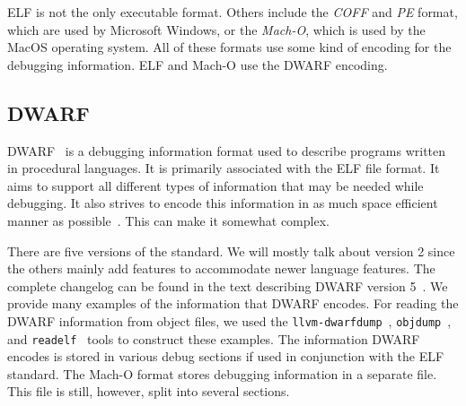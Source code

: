 ELF is not the only executable format. Others include the \textit{COFF} and
\textit{PE} format, which are used by Microsoft Windows, or the
\textit{Mach-O}, which is used by the MacOS operating system. All of these
formats use some kind of encoding for the debugging information. ELF and Mach-O
use the DWARF encoding.

\subsection{DWARF}
DWARF~\cite{dwarf} is a debugging information format used to describe programs
written in procedural languages. It is primarily associated with the ELF file
format. It aims to support all different types of information that may be
needed while debugging. It also strives to encode this information in as much
space efficient manner as possible~\cite{dwarf}. This can make it somewhat
complex. 

There are five versions of the standard. We will mostly talk about version 2
since the others mainly add features to accommodate newer language features.
The complete changelog can be found in the text describing DWARF version
5~\cite{dwarf-5}. We provide many examples of the information that DWARF
encodes. For reading the DWARF information from object files, we used the
\texttt{llvm-dwarfdump}~\cite{dwarfdump}, \texttt{objdump}~\cite{objdump}, and
\texttt{readelf}~\cite{readelf} tools to construct these examples. The
information DWARF encodes is stored in various debug sections if used in
conjunction with the ELF standard. The Mach-O format stores debugging
information in a separate file. This file is still, however, split into several
sections.

